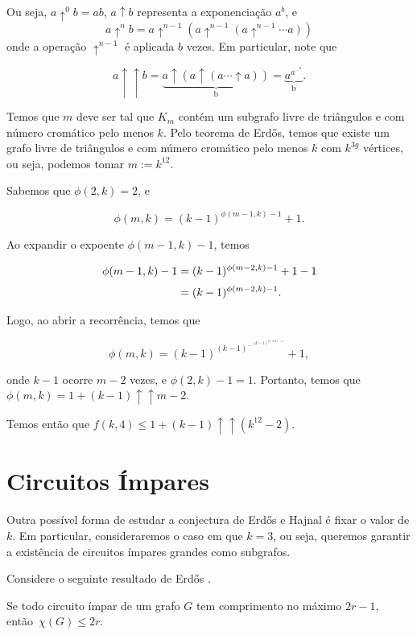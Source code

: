Ou seja, $a\uparrow^0 b = ab$, $a\uparrow b$ representa a exponenciação $a^b$, e \[a\uparrow^n b = a \uparrow^{n-1} (a \uparrow^{n-1} (a \uparrow^{n-1} \cdots a))\] onde a operação $\uparrow^{n-1}$ é aplicada $b$ vezes. Em particular, note que

\[a\uparrow\uparrow b = \underbrace{a\uparrow (a\uparrow (a \cdots \uparrow a))}_{\text{b}} = \underbrace{a^{a^{\cdots^{a}}}}_{\text{b}}.\]

Temos que $m$ deve ser tal que $K_m$ contém um subgrafo livre de triângulos e com número cromático pelo menos $k$. Pelo teorema de Erd\H{o}s, temos que existe um grafo livre de triângulos e com número cromático pelo menos $k$ com $k^{3g}$ vértices, ou seja, podemos tomar $m := k^{12}$.

Sabemos que $\phi(2,k) = 2$, e

\[\phi(m,k) = (k-1)^{\phi(m-1,k)-1}+1.\]

Ao expandir o expoente $\phi(m-1,k)-1$, temos

\begin{equation*}
\setlength{\jot}{5pt}
\begin{aligned}
\phi(m-1,k)-1 &= (k-1)^{\phi(m-2,k)-1}+1-1 \\
&= (k-1)^{\phi(m-2,k)-1}.
\end{aligned}
\end{equation*}

Logo, ao abrir a recorrência, temos que 

\[\phi(m,k) = (k-1)^{(k-1)^{\cdots^{(k-1)^{\phi(2,k)-1}}}}+1,\]

onde $k-1$ ocorre $m-2$ vezes, e $\phi(2,k)-1 = 1$. Portanto, temos que $\phi(m,k) = 1+(k-1)\uparrow\uparrow m-2$.

Temos então que $f(k,4) \leq 1+ (k-1) \uparrow\uparrow (k^{12}-2)$.

\section{Circuitos Ímpares}

Outra possível forma de estudar a conjectura de Erd\H{o}s e Hajnal é fixar o valor de $k$. Em particular, consideraremos o caso em que $k=3$, ou seja, queremos garantir a existência de circuitos ímpares grandes como subgrafos.

Considere o seguinte resultado de Erd\H{o}s \cite{erdHos1966chromatic}.

\begin{teorema}\label{teocircimpar}
Se todo circuito ímpar de um grafo $G$ tem comprimento no máximo $2r-1$, então~$\chi(G) \leq 2r$.
\end{teorema}

